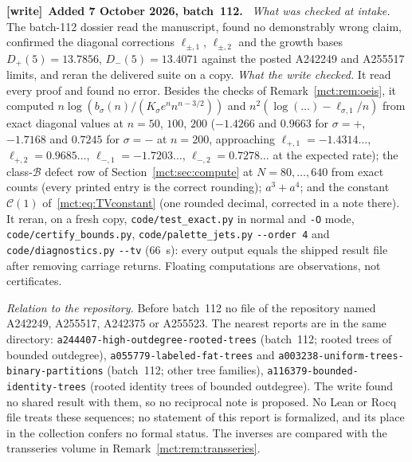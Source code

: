 \documentclass[11pt]{article}
\theoremstyle{definition}
\newcommand{\classB}{\mathcal B}
\newcommand{\file}[1]{\nolinkurl{#1}}
\newenvironment{writenote}[1][]{\par\smallskip\begingroup\small
 \noindent\textbf{[write]}\if\relax\detokenize{#1}\relax\else~\textbf{#1.}\fi\ }%
 {\par\endgroup\smallskip}
\begin{document}
\begin{writenote}[Added 7 October 2026, batch~112]
\emph{What was checked at intake.} The batch-112 dossier read the
manuscript, found no demonstrably wrong claim, confirmed the diagonal
corrections $\ell_{\pm,1}$, $\ell_{\pm,2}$ and the growth bases
$D_+(5)=13.7856$, $D_-(5)=13.4071$ against the posted A242249 and A255517
limits, and reran the delivered suite on a copy. \emph{What the write
checked.} It read every proof and found no error. Besides the checks of
Remark~\ref{mct:rem:oeis}, it computed $n\log(b_\sigma(n)/(K_\sigma
e^nn^{n-3/2}))$ and $n^2(\log(\ldots)-\ell_{\sigma,1}/n)$ from exact diagonal
values at $n=50$, $100$, $200$ ($-1.4266$ and $0.9663$ for $\sigma=+$,
$-1.7168$ and $0.7245$ for $\sigma=-$ at $n=200$, approaching
$\ell_{+,1}=-1.4314\ldots$, $\ell_{+,2}=0.9685\ldots$,
$\ell_{-,1}=-1.7203\ldots$, $\ell_{-,2}=0.7278\ldots$ at the expected rate);
the class-$\classB$ defect row of Section~\ref{mct:sec:compute} at
$N=80,\ldots,640$ from exact counts (every printed entry is the correct
rounding); $a^3+a^4$; and the constant $\mathcal C(1)$
of~\eqref{mct:eq:TVconstant} (one rounded decimal, corrected in a note
there). It reran, on a fresh copy, \file{code/test_exact.py} in normal and
\texttt{-O} mode, \file{code/certify_bounds.py},
\file{code/palette_jets.py} \texttt{-{}-order 4} and \file{code/diagnostics.py} \texttt{-{}-tv}
(66~s): every output equals the shipped result file after removing carriage
returns. Floating computations are observations, not certificates.

\emph{Relation to the repository.} Before batch~112 no file of the
repository named A242249, A255517, A242375 or A255523. The nearest reports
are in the same directory: \file{a244407-high-outdegree-rooted-trees}
(batch~112; rooted trees of bounded outdegree),
\file{a055779-labeled-fat-trees} and
\file{a003238-uniform-trees-binary-partitions} (batch~112; other tree
families), \file{a116379-bounded-identity-trees} (rooted identity trees of bounded outdegree). The write
found no shared result with them, so no reciprocal note is proposed. No Lean
or Rocq file treats these sequences; no statement of this report is
formalized, and its place in the collection confers no formal status. The
inverses are compared with the transseries volume in
Remark~\ref{mct:rem:transseries}.
\end{writenote}
\end{document}
